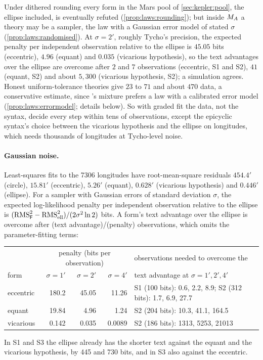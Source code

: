 \begin{example}\label{ex:kepler:graded}
Under dithered rounding every form in the Mars pool of \cref{sec:kepler:pool}, the ellipse included, is eventually refuted (\cref{prop:laws:rounding}); but inside $M_{A}$ a theory may be a sampler, the law with a Gaussian error model of stated $\sigma$ (\cref{prop:laws:randomised}). At $\sigma=2'$, roughly Tycho's precision, the expected penalty per independent observation relative to the ellipse is $45.05$ bits (eccentric), $4.96$ (equant) and $0.035$ (vicarious hypothesis), so the text advantages over the ellipse are overcome after $2$ and $7$ observations (eccentric, S1 and S2), $41$ (equant, S2) and about $5{,}300$ (vicarious hypothesis, S2); a simulation agrees. Honest uniform-tolerance theories give $23$ to $71$ and about $470$ data, a conservative estimate, since \SAIabbr's mixture prefers a law with a calibrated error model (\cref{prop:laws:errormodel}; details below). So with graded fit the data, not the syntax, decide every step within tens of observations, except the epicyclic syntax's choice between the vicarious hypothesis and the ellipse on longitudes, which needs thousands of longitudes at Tycho-level noise.
\end{example}

\paragraph{Gaussian noise.} Least-squares fits to the 7306 longitudes have root-mean-square residuals $454.4'$ (circle), $15.81'$ (eccentric), $5.26'$ (equant), $0.628'$ (vicarious hypothesis) and $0.446'$ (ellipse). For a sampler with Gaussian errors of standard deviation $\sigma$, the expected log-likelihood penalty per independent observation relative to the ellipse is $(\mathrm{RMS}_{\mathsf F}^2-\mathrm{RMS}_{\rm ell}^2)/(2\sigma^2\ln2)$ bits. A form's text advantage over the ellipse is overcome after (text advantage)/(penalty) observations, which omits the parameter-fitting terms:

\begin{center}\small
\begin{tabular}{@{}lrrrl@{}}
\toprule
& \multicolumn{3}{c}{penalty (bits per observation)} & observations needed to overcome the\\
form & $\sigma=1'$ & $\sigma=2'$ & $\sigma=4'$ & text advantage at $\sigma=1',2',4'$\\
\midrule
eccentric & 180.2 & 45.05 & 11.26 & S1 (100 bits): 0.6, 2.2, 8.9; S2 (312 bits): 1.7, 6.9, 27.7\\
equant & 19.84 & 4.96 & 1.24 & S2 (204 bits): 10.3, 41.1, 164.5\\
vicarious & 0.142 & 0.035 & 0.0089 & S2 (186 bits): 1313, 5253, 21013\\
\bottomrule
\end{tabular}
\end{center}
In S1 and S3 the ellipse already has the shorter text against the equant and the vicarious hypothesis, by 445 and 730 bits, and in S3 also against the eccentric.

